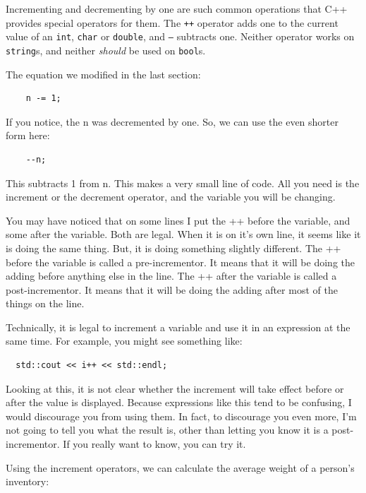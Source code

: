 Incrementing and decrementing by one are such common operations that C++
provides special operators for them.  The {\tt ++} operator adds one
to the current value of an {\tt int}, {\tt char} or {\tt double}, and
{\tt --} subtracts one.  Neither operator works on {\tt string}s,
and neither {\em should} be used on {\tt bool}s.

The equation we modified in the last section:
\begin{verbatim}
    n -= 1;
\end{verbatim}

If you notice, the n was decremented by one. So, we can use the even shorter form here:
\begin{verbatim}
    --n;
\end{verbatim}
This subtracts 1 from n. This makes a very small line of code. All you need is the increment or the decrement operator, and the variable you will be changing.

You may have noticed that on some lines I put the ++ before the variable, and some after the variable. Both are legal. When it is on it's own line, it seems like it is doing the same thing. But, it is doing something slightly different. The ++ before the variable is called a pre-incrementor. It means that it will be doing the adding before anything else in the line. The ++ after the variable is called a post-incrementor. It means that it will be doing the adding after most of the things on the line. 

Technically, it is legal to increment a variable and use it
in an expression at the same time.  For example, you might see
something like:

\begin{verbatim}
  std::cout << i++ << std::endl;
\end{verbatim}
%
Looking at this, it is not clear whether the increment will
take effect before or after the value is displayed.  Because
expressions like this tend to be confusing, I would discourage
you from using them.  In fact, to discourage you even more,
I'm not going to tell you what the result is, other than letting you know it is a post-incrementor.  If you really
want to know, you can try it.

Using the increment operators, we can calculate the average weight of a person's inventory:

